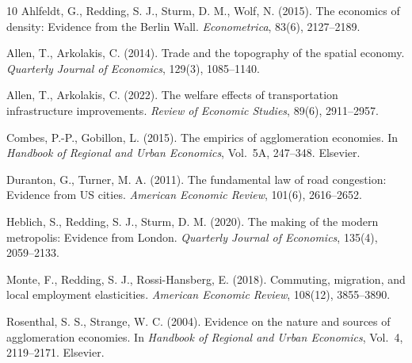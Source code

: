 \documentclass[12pt]{article}
\begin{document}
\begin{thebibliography}{10}
Ahlfeldt, G., Redding, S. J., Sturm, D. M., Wolf, N. (2015).
The economics of density: Evidence from the Berlin Wall.
\emph{Econometrica}, 83(6), 2127--2189.

Allen, T., Arkolakis, C. (2014). Trade and the topography of the
spatial economy. \emph{Quarterly Journal of Economics}, 129(3),
1085--1140.

Allen, T., Arkolakis, C. (2022). The welfare effects of transportation
infrastructure improvements. \emph{Review of Economic Studies},
89(6), 2911--2957.

Combes, P.-P., Gobillon, L. (2015). The empirics of agglomeration
economies. In \emph{Handbook of Regional and Urban Economics},
Vol.~5A, 247--348. Elsevier.

Duranton, G., Turner, M. A. (2011). The fundamental law of road
congestion: Evidence from US cities. \emph{American Economic Review},
101(6), 2616--2652.

Heblich, S., Redding, S. J., Sturm, D. M. (2020). The making of the
modern metropolis: Evidence from London. \emph{Quarterly Journal of
Economics}, 135(4), 2059--2133.

Monte, F., Redding, S. J., Rossi-Hansberg, E. (2018). Commuting,
migration, and local employment elasticities. \emph{American Economic
Review}, 108(12), 3855--3890.

Rosenthal, S. S., Strange, W. C. (2004). Evidence on the nature and
sources of agglomeration economies. In \emph{Handbook of Regional and
Urban Economics}, Vol.~4, 2119--2171. Elsevier.
\end{thebibliography}
\end{document}
